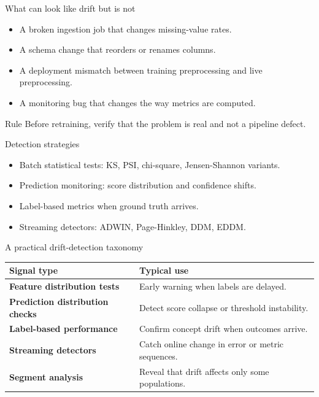 \begin{frame}{What can look like drift but is not}
\begin{itemize}
\item A broken ingestion job that changes missing-value rates.
\item A schema change that reorders or renames columns.
\item A deployment mismatch between training preprocessing and live preprocessing.
\item A monitoring bug that changes the way metrics are computed.
\end{itemize}
\begin{block}{Rule}
Before retraining, verify that the problem is real and not a pipeline defect.
\end{block}
\coursefooter
\end{frame}

\begin{frame}{Detection strategies}
\begin{itemize}
\item Batch statistical tests: KS, PSI, chi-square, Jensen-Shannon variants.
\item Prediction monitoring: score distribution and confidence shifts.
\item Label-based metrics when ground truth arrives.
\item Streaming detectors: ADWIN, Page-Hinkley, DDM, EDDM.
\end{itemize}
\coursefooter
\end{frame}

\begin{frame}{A practical drift-detection taxonomy}
\begin{tabularx}{\textwidth}{>{\bfseries}l X}
Signal type & Typical use \\
\toprule
Feature distribution tests & Early warning when labels are delayed. \\
Prediction distribution checks & Detect score collapse or threshold instability. \\
Label-based performance & Confirm concept drift when outcomes arrive. \\
Streaming detectors & Catch online change in error or metric sequences. \\
Segment analysis & Reveal that drift affects only some populations. \\
\bottomrule
\end{tabularx}
\coursefooter
\end{frame}


